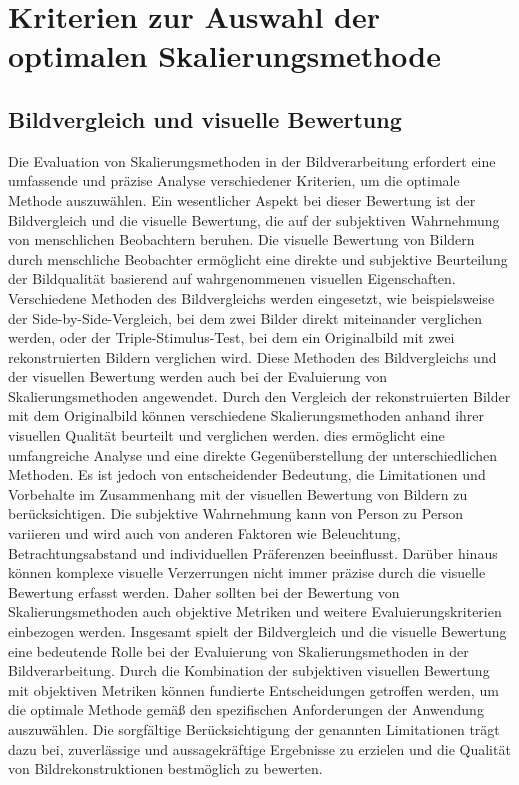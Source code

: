 \section{Kriterien zur Auswahl der optimalen Skalierungsmethode} %

    \subsection{Bildvergleich und visuelle Bewertung}
        
        Die Evaluation von Skalierungsmethoden in der Bildverarbeitung erfordert eine umfassende und präzise Analyse verschiedener Kriterien, um die optimale Methode auszuwählen. 
        Ein wesentlicher Aspekt bei dieser Bewertung ist der Bildvergleich und die visuelle Bewertung, die auf der subjektiven Wahrnehmung von menschlichen Beobachtern beruhen.
        Die visuelle Bewertung von Bildern durch menschliche Beobachter ermöglicht eine direkte und subjektive Beurteilung der Bildqualität basierend auf wahrgenommenen visuellen Eigenschaften. 
        Verschiedene Methoden des Bildvergleichs werden eingesetzt, wie beispielsweise der Side-by-Side-Vergleich, bei dem zwei Bilder direkt miteinander verglichen werden, oder der Triple-Stimulus-Test, bei dem ein Originalbild mit zwei rekonstruierten Bildern verglichen wird.
        Diese Methoden des Bildvergleichs und der visuellen Bewertung werden auch bei der Evaluierung von Skalierungsmethoden angewendet. 
        Durch den Vergleich der rekonstruierten Bilder mit dem Originalbild können verschiedene Skalierungsmethoden anhand ihrer visuellen Qualität beurteilt und verglichen werden. 
        dies ermöglicht eine umfangreiche Analyse und eine direkte Gegenüberstellung der unterschiedlichen Methoden.
        Es ist jedoch von entscheidender Bedeutung, die Limitationen und Vorbehalte im Zusammenhang mit der visuellen Bewertung von Bildern zu berücksichtigen. 
        Die subjektive Wahrnehmung kann von Person zu Person variieren und wird auch von anderen Faktoren wie Beleuchtung, Betrachtungsabstand und individuellen Präferenzen beeinflusst. 
        Darüber hinaus können komplexe visuelle Verzerrungen nicht immer präzise durch die visuelle Bewertung erfasst werden. 
        Daher sollten bei der Bewertung von Skalierungsmethoden auch objektive Metriken und weitere Evaluierungskriterien einbezogen werden.
        Insgesamt spielt der Bildvergleich und die visuelle Bewertung eine bedeutende Rolle bei der Evaluierung von Skalierungsmethoden in der Bildverarbeitung.
        Durch die Kombination der subjektiven visuellen Bewertung mit objektiven Metriken können fundierte Entscheidungen getroffen werden, um die optimale Methode gemäß den spezifischen Anforderungen der Anwendung auszuwählen. 
        Die sorgfältige Berücksichtigung der genannten Limitationen trägt dazu bei, zuverlässige und aussagekräftige Ergebnisse zu erzielen und die Qualität von Bildrekonstruktionen bestmöglich zu bewerten.
    
